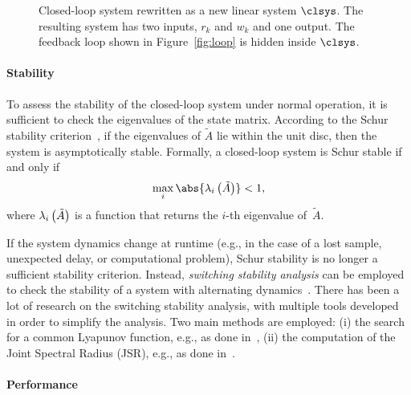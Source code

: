 \begin{figure}[t]
\centering

\caption{Closed-loop system rewritten as a new linear system $\clsys$.
    The resulting system has two inputs, $r_k$ and $w_k$ and one output.
    The feedback loop shown in Figure~\ref{fig:loop} is hidden inside $\clsys$.}
\label{fig:closedloop}
\end{figure}

\paragraph*{Stability}

To assess the stability of the closed-loop system under normal operation, it is sufficient to check the eigenvalues of the state matrix. 
According to the Schur stability criterion~\cite{Astrom:1997}, if the eigenvalues of $\tilde A$ lie within the unit disc, then the system is asymptotically stable. 
Formally, a closed-loop system is Schur stable if and only if
%
\begin{equation}
    \label{eq:schur}
    \max_i{\abs{\eig{i}{\tilde A}}} < 1,
\end{equation}
%
where $\lambda_{i}\left( \tilde A \right)$ is a function that returns the $i$-th eigenvalue of~$\tilde A$.

If the system dynamics change at runtime (e.g., in the case of a lost sample, unexpected delay, or computational problem), Schur stability is no longer a sufficient stability criterion.
Instead, \emph{switching stability analysis} can be employed to check the stability of a system with alternating dynamics~\cite{Jungers2009}.
There has been a lot of research on the switching stability analysis, with multiple tools developed in order to simplify the analysis.
Two main methods are employed: (i) the search for a common Lyapunov function, e.g., as done in~\cite{Linsenmayer:2017}, (ii) the computation of the Joint Spectral Radius (JSR), e.g., as done in~\cite{Maggio:2020,Jungers:2014}.

\paragraph*{Performance}

